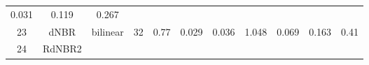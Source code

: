 \documentclass[twoside,12pt,final]{ucthesis-CA2012}
\begin{document}
\begin{ucmainmatter}
\begin{longtable}[]{@{}ccccccccccc@{}}
\begin{minipage}[t]{0.05\columnwidth}
0.031\strut
\end{minipage} & \begin{minipage}[t]{0.05\columnwidth}\centering\strut
0.119\strut
\end{minipage} & \begin{minipage}[t]{0.05\columnwidth}\centering\strut
0.267\strut
\end{minipage}\tabularnewline
\begin{minipage}[t]{0.04\columnwidth}\centering\strut
23\strut
\end{minipage} & \begin{minipage}[t]{0.11\columnwidth}\centering\strut
dNBR\strut
\end{minipage} & \begin{minipage}[t]{0.06\columnwidth}\centering\strut
bilinear\strut
\end{minipage} & \begin{minipage}[t]{0.08\columnwidth}\centering\strut
32\strut
\end{minipage} & \begin{minipage}[t]{0.08\columnwidth}\centering\strut
0.77\strut
\end{minipage} & \begin{minipage}[t]{0.07\columnwidth}\centering\strut
0.029\strut
\end{minipage} & \begin{minipage}[t]{0.07\columnwidth}\centering\strut
0.036\strut
\end{minipage} & \begin{minipage}[t]{0.07\columnwidth}\centering\strut
1.048\strut
\end{minipage} & \begin{minipage}[t]{0.05\columnwidth}\centering\strut
0.069\strut
\end{minipage} & \begin{minipage}[t]{0.05\columnwidth}\centering\strut
0.163\strut
\end{minipage} & \begin{minipage}[t]{0.05\columnwidth}\centering\strut
0.41\strut
\end{minipage}\tabularnewline
\begin{minipage}[t]{0.04\columnwidth}\centering\strut
24\strut
\end{minipage} & \begin{minipage}[t]{0.11\columnwidth}\centering\strut
RdNBR2\strut
\end{minipage} & \begin{minipage}[t]{0.06\columnwidth}\centering\strut

\end{minipage}
\end{longtable}
\end{ucmainmatter}
\end{document}
